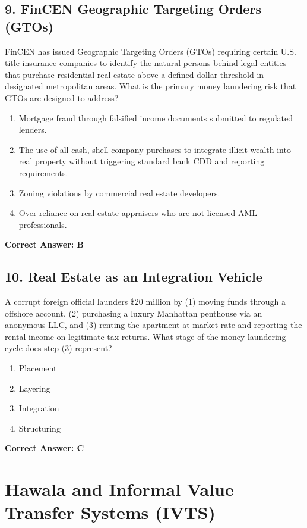 \documentclass[11pt,a4paper]{article}
\begin{document}
	\subsection{9. FinCEN Geographic Targeting Orders (GTOs)}
	FinCEN has issued Geographic Targeting Orders (GTOs) requiring certain U.S. title insurance companies to identify the natural persons behind legal entities that purchase residential real estate above a defined dollar threshold in designated metropolitan areas. What is the primary money laundering risk that GTOs are designed to address?
	\begin{enumerate}[label=\Alph*.]
		\item Mortgage fraud through falsified income documents submitted to regulated lenders.
		\item The use of all-cash, shell company purchases to integrate illicit wealth into real property without triggering standard bank CDD and reporting requirements.
		\item Zoning violations by commercial real estate developers.
		\item Over-reliance on real estate appraisers who are not licensed AML professionals.
	\end{enumerate}
	\textbf{Correct Answer: B}
	
	\subsection{10. Real Estate as an Integration Vehicle}
	A corrupt foreign official launders \$20 million by (1) moving funds through a offshore account, (2) purchasing a luxury Manhattan penthouse via an anonymous LLC, and (3) renting the apartment at market rate and reporting the rental income on legitimate tax returns. What stage of the money laundering cycle does step (3) represent?
	\begin{enumerate}[label=\Alph*.]
		\item Placement
		\item Layering
		\item Integration
		\item Structuring
	\end{enumerate}
	\textbf{Correct Answer: C}
	
	\section{Hawala and Informal Value Transfer Systems (IVTS)}
	
\end{document}
